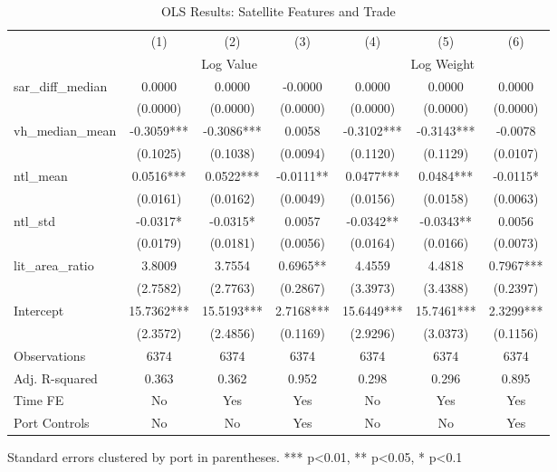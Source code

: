 \begin{table}[ht]
\centering
\caption{OLS Results: Satellite Features and Trade}
\begin{tabular}{lcccccc}
\toprule
 & (1) & (2) & (3) & (4) & (5) & (6) \\
 & \multicolumn{3}{c}{Log Value} & \multicolumn{3}{c}{Log Weight} \\
\cmidrule(lr){2-4} \cmidrule(lr){5-7}
sar\_diff\_median & 0.0000 & 0.0000 & -0.0000 & 0.0000 & 0.0000 & 0.0000 \\
 & (0.0000) & (0.0000) & (0.0000) & (0.0000) & (0.0000) & (0.0000) \\
vh\_median\_mean & -0.3059*** & -0.3086*** & 0.0058 & -0.3102*** & -0.3143*** & -0.0078 \\
 & (0.1025) & (0.1038) & (0.0094) & (0.1120) & (0.1129) & (0.0107) \\
ntl\_mean & 0.0516*** & 0.0522*** & -0.0111** & 0.0477*** & 0.0484*** & -0.0115* \\
 & (0.0161) & (0.0162) & (0.0049) & (0.0156) & (0.0158) & (0.0063) \\
ntl\_std & -0.0317* & -0.0315* & 0.0057 & -0.0342** & -0.0343** & 0.0056 \\
 & (0.0179) & (0.0181) & (0.0056) & (0.0164) & (0.0166) & (0.0073) \\
lit\_area\_ratio & 3.8009 & 3.7554 & 0.6965** & 4.4559 & 4.4818 & 0.7967*** \\
 & (2.7582) & (2.7763) & (0.2867) & (3.3973) & (3.4388) & (0.2397) \\
Intercept & 15.7362*** & 15.5193*** & 2.7168*** & 15.6449*** & 15.7461*** & 2.3299*** \\
 & (2.3572) & (2.4856) & (0.1169) & (2.9296) & (3.0373) & (0.1156) \\
\midrule
Observations & 6374 & 6374 & 6374 & 6374 & 6374 & 6374 \\
Adj. R-squared & 0.363 & 0.362 & 0.952 & 0.298 & 0.296 & 0.895 \\
Time FE & No & Yes & Yes & No & Yes & Yes \\
Port Controls & No & No & Yes & No & No & Yes \\
\bottomrule
\end{tabular}
\begin{tablenotes}
\footnotesize
\item Standard errors clustered by port in parentheses. *** p<0.01, ** p<0.05, * p<0.1
\end{tablenotes}
\end{table}
